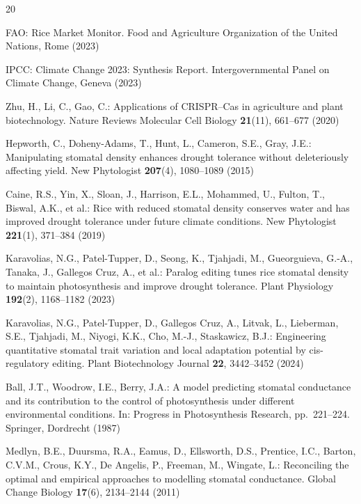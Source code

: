 \documentclass[runningheads]{llncs}
\begin{document}
\begin{thebibliography}{20}

FAO: Rice Market Monitor. Food and Agriculture Organization of the United Nations, Rome (2023)

IPCC: Climate Change 2023: Synthesis Report. Intergovernmental Panel on Climate Change, Geneva (2023)

Zhu, H., Li, C., Gao, C.: Applications of CRISPR--Cas in agriculture and plant biotechnology. Nature Reviews Molecular Cell Biology \textbf{21}(11), 661--677 (2020)

Hepworth, C., Doheny-Adams, T., Hunt, L., Cameron, S.E., Gray, J.E.: Manipulating stomatal density enhances drought tolerance without deleteriously affecting yield. New Phytologist \textbf{207}(4), 1080--1089 (2015)

Caine, R.S., Yin, X., Sloan, J., Harrison, E.L., Mohammed, U., Fulton, T., Biswal, A.K., et al.: Rice with reduced stomatal density conserves water and has improved drought tolerance under future climate conditions. New Phytologist \textbf{221}(1), 371--384 (2019)

Karavolias, N.G., Patel-Tupper, D., Seong, K., Tjahjadi, M., Gueorguieva, G.-A., Tanaka, J., Gallegos Cruz, A., et al.: Paralog editing tunes rice stomatal density to maintain photosynthesis and improve drought tolerance. Plant Physiology \textbf{192}(2), 1168--1182 (2023)

Karavolias, N.G., Patel-Tupper, D., Gallegos Cruz, A., Litvak, L., Lieberman, S.E., Tjahjadi, M., Niyogi, K.K., Cho, M.-J., Staskawicz, B.J.: Engineering quantitative stomatal trait variation and local adaptation potential by cis-regulatory editing. Plant Biotechnology Journal \textbf{22}, 3442--3452 (2024)

Ball, J.T., Woodrow, I.E., Berry, J.A.: A model predicting stomatal conductance and its contribution to the control of photosynthesis under different environmental conditions. In: Progress in Photosynthesis Research, pp.~221--224. Springer, Dordrecht (1987)

Medlyn, B.E., Duursma, R.A., Eamus, D., Ellsworth, D.S., Prentice, I.C., Barton, C.V.M., Crous, K.Y., De Angelis, P., Freeman, M., Wingate, L.: Reconciling the optimal and empirical approaches to modelling stomatal conductance. Global Change Biology \textbf{17}(6), 2134--2144 (2011)


\end{thebibliography}
\end{document}
